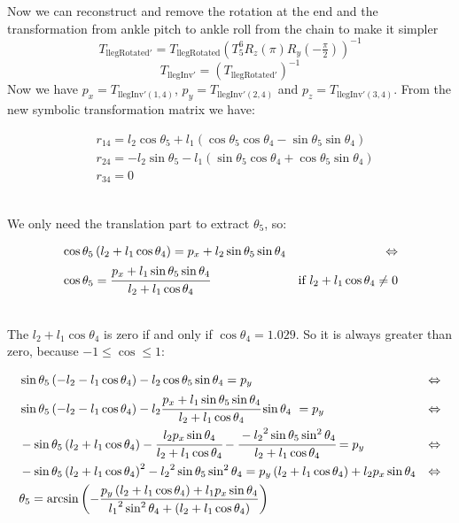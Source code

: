 Now we can reconstruct and remove the rotation at the end and the transformation from ankle pitch to ankle roll from the chain to make it simpler
\[
T_{\text{llegRotated}'} = T_\text{llegRotated}\left(T^6_5R_z\left(\pi\right)R_y(-\tfrac{\pi}{2})\right)^{-1}
\]
\[
T_{\text{llegInv}'} = \left( T_{\text{llegRotated}'} \right) ^{-1}
\]
Now we have $p_x = T_{\text{llegInv}'(1,4)}$, $p_y = T_{\text{llegInv}'(2,4)}$ and $p_z = T_{\text{llegInv}'(3,4)}$. From the new symbolic transformation matrix we have:
\begin{small}
\begin{align*}
&r_{14} = l_2\cos\theta_5 + l_1\left(\cos\theta_5\cos\theta_4 - \sin\theta_5\sin\theta_4\right)\\
&r_{24} = -l_2\sin\theta_5 - l_1\left(\sin\theta_5\cos\theta_4 + \cos\theta_5\sin\theta_4\right)\\
&r_{34} = 0
\end{align*}
\end{small}\\
We only need the translation part to extract $\theta_5$, so:
\begin{small}
\begin{align*}
&\cos\theta_5\left(l_2+l_1\cos\theta_4\right) = p_x + l_2\sin\theta_5\sin\theta_4 & \Leftrightarrow\\
&\cos\theta_5 = \cfrac{p_x + l_1\sin\theta_5\sin\theta_4}{l_2+l_1\cos\theta_4}&\text{if }l_2+l_1\cos\theta_4\neq0\\
\end{align*}
\end{small}\\
The $l_2+l_1\cos\theta_4$ is zero if and only if $\cos\theta_4 = 1.029$. So it is always greater than zero, because $-1 \leq \cos \leq 1$:
\begin{small}
\begin{align*}
&\sin\theta_5\left(-l_2-l_1\cos\theta_4\right) - l_2\cos\theta_5\sin\theta_4 = p_y& \Leftrightarrow\\
&\sin\theta_5\left(-l_2-l_1\cos\theta_4\right) - l_2\cfrac{p_x + l_1\sin\theta_5\sin\theta_4}{l_2+l_1\cos\theta_4}\sin\theta_4\ =p_y & \Leftrightarrow\\
&-\sin\theta_5\left(l_2+l_1\cos\theta_4\right) - \cfrac{l_2p_x\sin\theta_4}{l_2+l_1\cos\theta_4} - \cfrac{-{l_2}^2\sin\theta_5\sin^2\theta_4}{l_2+l_1\cos\theta_4} = p_y&\Leftrightarrow\\
&-\sin\theta_5\left(l_2+l_1\cos\theta_4\right)^2 - {l_2}^2\sin\theta_5\sin^2\theta_4 = p_y\left(l_2+l_1\cos\theta_4\right) + l_2p_x\sin\theta_4 & \Leftrightarrow\\
&\theta_5 = \arcsin\left(-\frac{p_y\left(l_2+l_1\cos\theta_4\right) + l_1p_x\sin\theta_4}{{l_1}^2\sin^2\theta_4 + \left(l_2 + l_1\cos\theta_4\right)}\right)
\end{align*}
\end{small}
